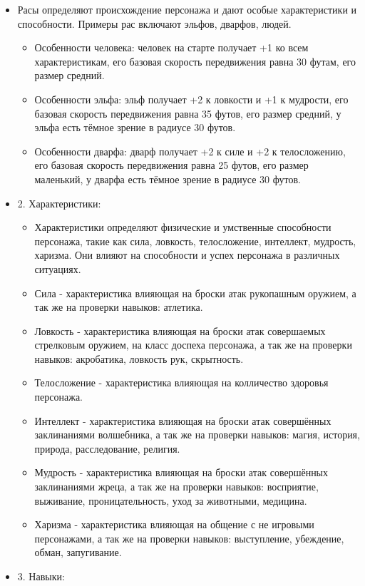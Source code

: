 \begin{itemize}
\begin{itemize}
		\item Расы определяют происхождение персонажа и дают особые характеристики и способности. Примеры рас включают эльфов, дварфов, людей.
			\begin{itemize}
			\item Особенности человека: человек на старте получает +1 ко всем характеристикам, его базовая скорость передвижения равна 30 футам, его размер средний.
			\item Особенности эльфа: эльф получает +2 к ловкости и +1 к мудрости, его базовая скорость передвижения равна 35 футов, его размер средний, у эльфа есть тёмное зрение в радиусе 30 футов.
			\item Особенности дварфа: дварф получает +2 к силе и +2 к телосложению, его базовая скорость передвижения равна 25 футов, его размер маленький, у дварфа есть тёмное зрение в радиусе 30 футов.
			\end{itemize}
		\item 2. Характеристики:
		\begin{itemize}
			\item Характеристики определяют физические и умственные способности персонажа, такие как сила, ловкость, телосложение, интеллект, мудрость, харизма. Они влияют на способности и успех персонажа в различных ситуациях.
			\item Сила - характеристика влияющая на броски атак рукопашным оружием, а так же на проверки навыков: атлетика.
			\item Ловкость - характеристика влияющая на броски атак совершаемых стрелковым оружием, на класс доспеха персонажа, а так же на проверки навыков: акробатика, ловкость рук, скрытность.
			\item Телосложение - характеристика влияющая на колличество здоровья персонажа.
			\item Интеллект - характеристика влияющая на броски атак совершённых заклинаниями волшебника, а так же на проверки навыков: магия, история, природа, расследование, религия.
			\item Мудрость - характеристика влияющая на броски атак  совершённых заклинаниями жреца, а так же на проверки навыков: восприятие, выживание, проницательность, уход за животными, медицина.
			\item Харизма - характеристика влияющая на общение с не игровыми персонажами, а так же на проверки навыков: выступление, убеждение, обман, запугивание.
		\end{itemize}
		\item 3. Навыки:

\end{itemize}
\end{itemize}

